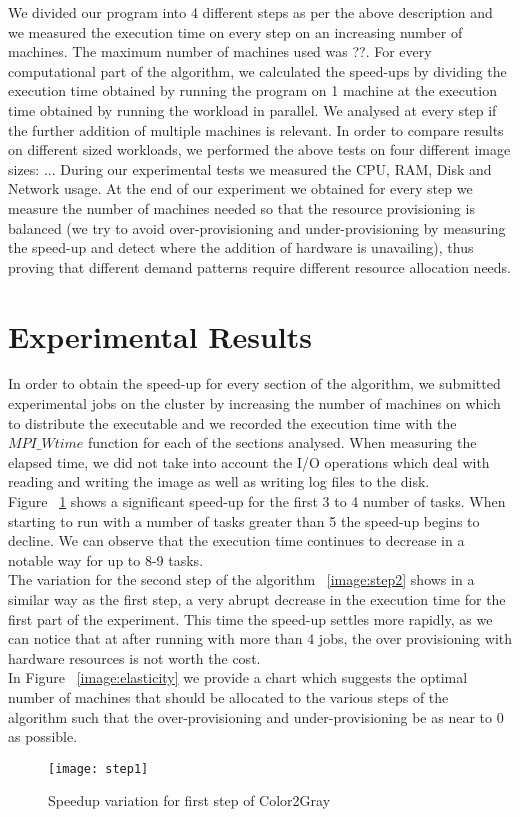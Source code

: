 \documentclass[conference]{IEEEtran}
\begin{document}
We divided our program into 4 different steps as per the above description and we measured the execution time on every step on an increasing number of machines. The maximum number of machines used was ??. For every computational part of the algorithm, we calculated the speed-ups by dividing the execution time obtained by running the program on 1 machine at the execution time obtained by running the workload in parallel. We analysed at every step if the further addition of multiple machines is relevant. In order to compare results on different sized workloads, we performed the above tests on four different image sizes: ... During our experimental tests we measured the CPU, RAM, Disk and Network usage. At the end of our experiment we obtained for every step we measure the number of machines needed so that the resource provisioning is balanced (we try to avoid over-provisioning and under-provisioning by measuring the speed-up and detect where the addition of hardware is unavailing), thus proving that different demand patterns require different resource allocation needs.

\section{Experimental Results}
In order to obtain the speed-up for every section of the algorithm, we submitted experimental jobs on the cluster by increasing the number of machines on which to distribute the executable and we recorded the execution time with the $\mathit{MPI\_Wtime}$ function for each of the sections analysed. When measuring the elapsed time, we did not take into account the I/O operations which deal with reading and writing the image as well as writing log files to the disk.\\
Figure ~\ref{image:step1} shows a significant speed-up for the first 3 to 4 number of tasks. When starting to run with a number of tasks greater than 5 the speed-up begins to decline. We can observe that the execution time continues to decrease in a notable way for up to 8-9 tasks.\\
The variation for the second step of the algorithm ~\ref{image:step2} shows in a similar way as the first step, a very abrupt decrease in the execution time for the first part of the experiment. This time the speed-up settles more rapidly, as we can notice that at after running with more than 4 jobs, the over provisioning with hardware resources is not worth the cost.\\
In Figure ~\ref{image:elasticity} we provide a chart which suggests the optimal number of machines that should be allocated to the various steps of the algorithm such that the over-provisioning and under-provisioning be as near to 0 as possible.
\begin{figure}
	\centering
	\texttt{[image: step1]}
	\caption{Speedup variation for first step of Color2Gray}
	\label{image:step1}
\end{figure}
\end{document}
